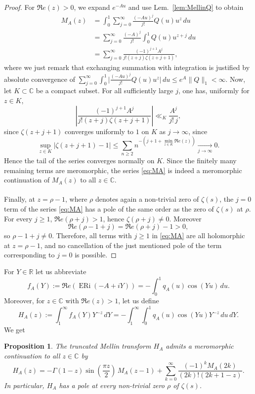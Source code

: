 \documentclass[a4paper,10pt]{amsart}
\DeclareMathOperator{\ERi}{ERi}
\newcommand{\C}{\mathbb C}
\newtheorem{proposition}[equation]{Proposition}
\theoremstyle{definition}
\numberwithin{equation}{section}
\def\R{\mathbb R}
\def\C{\mathbb C}
\begin{document}
\begin{proof}
For $\Re e(z)>0$, we expand $e^{-Au}$ and use Lem.\ \ref{lem:MellinQ} to obtain
$$
\begin{aligned}
M_A(z)
&= \int_0^1\sum_{j=0}^{\infty}\frac{(-Au)^j}{j!}
Q(u)u^{z}\,du\\
&= \sum_{j=0}^{\infty}\frac{(-A)^j}{j!} \int_0^1Q(u)u^{z+j}\,du\\
&= \sum_{j=0}^{\infty} \frac{(-1)^{j+1}A^j}{j!(z+j)\zeta(z+j+1)},
\end{aligned}
$$
where we just remark that exchanging summation with integration is justified by absolute convergence of $\sum_{j=0}^{\infty}\int_0^1\big | \frac{(-Au)^j}{j!}
Q(u)u^{z} \big|\,du\leq e^A \|Q\|_1<\infty$. Now, let $K\subset\C$ be a compact subset. For all sufficiently large $j$, one has, uniformly for $z\in K$,
$$
\left|\frac{(-1)^{j+1}A^j}{j!(z+j)\zeta(z+j+1)}\right|\ll_K \frac{A^j}{j!\,j},
$$
since $\zeta(z+j+1)$ converges uniformly to $1$ on $K$ as $j\to\infty$, since
$$ \sup_{z\in K} \bigl|\zeta(z+j+1)-1\bigr|\leq \sum_{n\geq 2} n^{-(j+1+\min_{z\in K}\Re e(z) )}\underset{j \to \infty}{\longrightarrow} 0.$$ Hence the tail of the series converges normally on \(K\). Since the finitely many remaining terms are meromorphic, the series \eqref{eq:MA} is indeed a meromorphic continuation of $M_A(z)$ to all $z\in\C$.\\\\
Finally, at $z=\rho-1$, where $\rho$ denotes again a non-trivial zero of $\zeta(s)$, the $j=0$ term of the series \eqref{eq:MA} has a pole of the same order as the zero
of $\zeta(s)$ at $\rho$. For every $j\ge1$, $\Re e(\rho+j)>1$, hence $\zeta(\rho+j)\neq0$. Moreover
$$
\Re e(\rho-1+j)=\Re e(\rho+j)-1>0,
$$
so $\rho-1+j\neq0$. Therefore, all terms with $j\ge1$ in \eqref{eq:MA} are all holomorphic at $z=\rho-1$, and no cancellation of the just mentioned pole of the term corresponding to $j=0$ is possible.
\end{proof}

\noindent For $Y\in\R$ let us abbreviate 
$$f_A(Y):=\Re e(\ERi(-A+iY))=-\int_0^1q_A(u)\cos(Yu)\,du.$$ 
Moreover, for $z\in\C$ with $\Re e(z)>1$, let us define
$$
H_A(z):=\int_1^\infty f_A(Y)Y^{-z}\,dY = -\int_1^\infty \int_0^1q_A(u)\cos(Yu)Y^{-z}\,du\,dY .
$$
We get

\begin{proposition}\label{prop:HA}
The truncated Mellin transform $H_A$ admits a meromorphic continuation to all $z\in\C$ by
\begin{equation}\label{eq:HAtrans}
H_A(z) = -\Gamma(1-z)\sin\left(\frac{\pi z}{2}\right)\,M_A(z-1) +
\sum_{k=0}^{\infty}
\frac{(-1)^kM_A(2k)}{(2k)!(2k+1-z)}.
\end{equation}
In particular, $H_A$ has a pole at every non-trivial zero $\rho$ of $\zeta(s)$.
\end{proposition}
\end{document}
